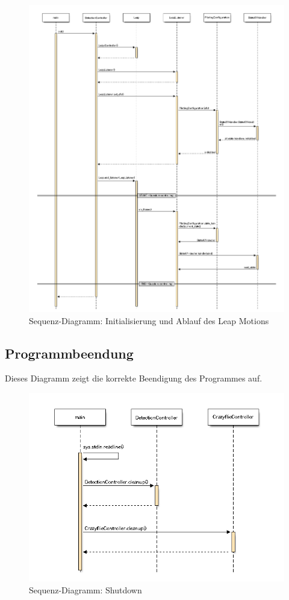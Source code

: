 \begin{figure}[H]
	\centering
	\includegraphics[width=1.0\textwidth]{figures/poc/seq_dia_detection.png}
	\caption{Sequenz-Diagramm: Initialisierung und Ablauf des Leap Motions}
\end{figure}

\clearpage
\subsection{Programmbeendung}
Dieses Diagramm zeigt die korrekte Beendigung des Programmes auf.

\begin{figure}[H]
	\centering
	\includegraphics[width=1.0\textwidth]{figures/poc/seq_dia_shutdown.png}
	\caption{Sequenz-Diagramm: Shutdown}
\end{figure}


